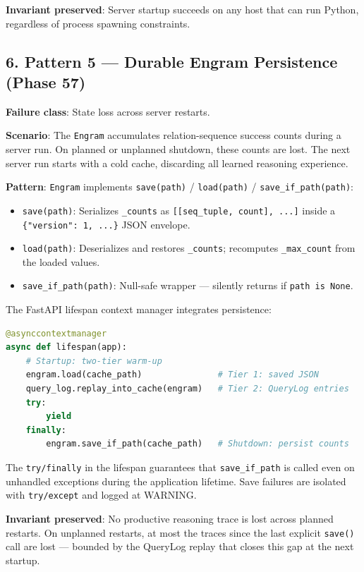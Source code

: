 \textbf{Invariant preserved}: Server startup succeeds on any host that can run Python, regardless of process spawning constraints.

\subsection*{6. Pattern 5 --- Durable Engram Persistence (Phase 57)}

\textbf{Failure class}: State loss across server restarts.

\textbf{Scenario}: The \texttt{Engram} accumulates relation-sequence success counts during a server run. On planned or unplanned shutdown, these counts are lost. The next server run starts with a cold cache, discarding all learned reasoning experience.

\textbf{Pattern}: \texttt{Engram} implements \texttt{save(path)} / \texttt{load(path)} / \texttt{save\_if\_path(path)}:

\begin{itemize}
  \item \texttt{save(path)}: Serializes \texttt{\_counts} as \texttt{[[seq\_tuple, count], ...]} inside a \texttt{\{"version": 1, ...\}} JSON envelope.
  \item \texttt{load(path)}: Deserializes and restores \texttt{\_counts}; recomputes \texttt{\_max\_count} from the loaded values.
  \item \texttt{save\_if\_path(path)}: Null-safe wrapper --- silently returns if \texttt{path is None}.
\end{itemize}


The FastAPI lifespan context manager integrates persistence:

\begin{lstlisting}[language=Python]
@asynccontextmanager
async def lifespan(app):
    # Startup: two-tier warm-up
    engram.load(cache_path)               # Tier 1: saved JSON
    query_log.replay_into_cache(engram)   # Tier 2: QueryLog entries
    try:
        yield
    finally:
        engram.save_if_path(cache_path)   # Shutdown: persist counts
\end{lstlisting}

The \texttt{try/finally} in the lifespan guarantees that \texttt{save\_if\_path} is called even on unhandled exceptions during the application lifetime. Save failures are isolated with \texttt{try/except} and logged at WARNING.

\textbf{Invariant preserved}: No productive reasoning trace is lost across planned restarts. On unplanned restarts, at most the traces since the last explicit \texttt{save()} call are lost --- bounded by the QueryLog replay that closes this gap at the next startup.

